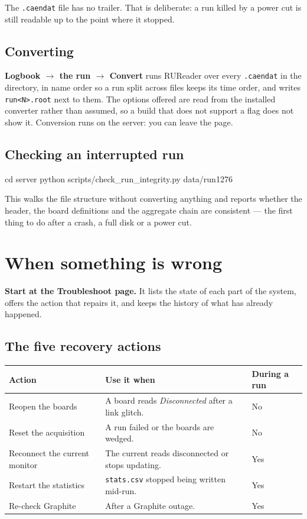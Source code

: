\documentclass[11pt,a4paper]{report}
\newcommand{\ui}[1]{\textbf{#1}}          %
\newcommand{\file}[1]{\texttt{#1}}
\begin{document}
The \file{.caendat} file has no trailer. That is deliberate: a run killed by a
power cut is still readable up to the point where it stopped.

\section{Converting}

\ui{Logbook $\rightarrow$ the run $\rightarrow$ Convert} runs RUReader over every
\file{.caendat} in the directory, in name order so a run split across files keeps
its time order, and writes \file{run<N>.root} next to them. The options offered
are read from the installed converter rather than assumed, so a build that does
not support a flag does not show it. Conversion runs on the server: you can leave
the page.

\section{Checking an interrupted run}

\begin{shell}
cd server
python scripts/check_run_integrity.py data/run1276
\end{shell}

This walks the file structure without converting anything and reports whether the
header, the board definitions and the aggregate chain are consistent --- the first
thing to do after a crash, a full disk or a power cut.

\chapter{When something is wrong}
\label{ch:trouble}

\textbf{Start at the Troubleshoot page.} It lists the state of each part of the
system, offers the action that repairs it, and keeps the history of what has
already happened.

\section{The five recovery actions}

\begin{center}
\begin{tabular}{@{}L{0.30\textwidth}L{0.50\textwidth}L{0.12\textwidth}@{}}
\toprule
\textbf{Action} & \textbf{Use it when} & \textbf{During a run} \\
\midrule
Reopen the boards & A board reads \emph{Disconnected} after a link glitch. & No \\
Reset the acquisition & A run failed or the boards are wedged. & No \\
Reconnect the current monitor & The current reads disconnected or stops updating. & Yes \\
Restart the statistics & \file{stats.csv} stopped being written mid-run. & Yes \\
Re-check Graphite & After a Graphite outage. & Yes \\
\bottomrule
\end{tabular}
\end{center}
\end{document}
